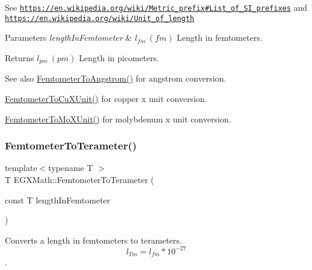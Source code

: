 See \href{https://en.wikipedia.org/wiki/Metric_prefix#List_of_SI_prefixes}{\tt https\+://en.\+wikipedia.\+org/wiki/\+Metric\+\_\+prefix\#\+List\+\_\+of\+\_\+\+S\+I\+\_\+prefixes} and \href{https://en.wikipedia.org/wiki/Unit_of_length}{\tt https\+://en.\+wikipedia.\+org/wiki/\+Unit\+\_\+of\+\_\+length} 
\begin{DoxyParams}{Parameters}
{\em length\+In\+Femtometer} & $ l_{fm}\ (fm)$ Length in femtometers. \\
\hline
\end{DoxyParams}
\begin{DoxyReturn}{Returns}
$ l_{pm}\ (pm)$ Length in picometers. 
\end{DoxyReturn}
\begin{DoxySeeAlso}{See also}
\mbox{\hyperlink{group___e_g_x_math-_conversions-_length_conversions-_s_i-_femtometer-_non-_s_i_ga72862654ebe3812db0fbf8d11d7059ff}{Femtometer\+To\+Angstrom()}} for angstrom conversion. 

\mbox{\hyperlink{group___e_g_x_math-_conversions-_length_conversions-_s_i-_femtometer-_non-_s_i_ga59bde341fe80506851e39cd2ceb3747b}{Femtometer\+To\+Cu\+X\+Unit()}} for copper x unit conversion. 

\mbox{\hyperlink{group___e_g_x_math-_conversions-_length_conversions-_s_i-_femtometer-_non-_s_i_ga57801d7c681362c1a11053233e31c415}{Femtometer\+To\+Mo\+X\+Unit()}} for molybdenum x unit conversion. 
\end{DoxySeeAlso}
\mbox{\label{group___e_g_x_math-_conversions-_length_conversions-_s_i-_femtometer-_s_i_ga9b76ed4edddb239375ea2ec8eb1cbc11}} 
\subsubsection{\texorpdfstring{Femtometer\+To\+Terameter()}{FemtometerToTerameter()}}
{\footnotesize\ttfamily template$<$typename T $>$ \\
T E\+G\+X\+Math\+::\+Femtometer\+To\+Terameter (\begin{DoxyParamCaption}\item[{const T}]{length\+In\+Femtometer }\end{DoxyParamCaption})}



Converts a length in femtometers to terameters. \[ l_{Tm}=l_{fm} * 10^{-27} \]. 


